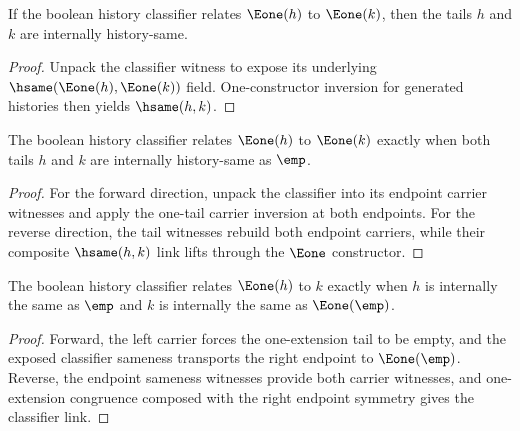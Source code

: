 \begin{theorem}
\label{thm:bool-history-classifier-e1-tail-hsame}
If the boolean history classifier relates $\Eone(h)$ to $\Eone(k)$, then the
tails $h$ and $k$ are internally history-same.
\end{theorem}
\begin{proof}
Unpack the classifier witness to expose its underlying
$\hsame(\Eone(h),\Eone(k))$ field. One-constructor inversion for generated
histories then yields $\hsame(h,k)$.
\end{proof}

\begin{theorem}
\label{thm:bool-history-classifier-e1-iff-tails-empty}
The boolean history classifier relates \(\Eone(h)\) to \(\Eone(k)\) exactly
when both tails \(h\) and \(k\) are internally history-same as \(\emp\).
\end{theorem}
\begin{proof}
For the forward direction, unpack the classifier into its endpoint carrier
witnesses and apply the one-tail carrier inversion at both endpoints. For the
reverse direction, the tail witnesses rebuild both endpoint carriers, while
their composite \(\hsame(h,k)\) link lifts through the \(\Eone\) constructor.
\end{proof}

\begin{theorem}
\label{thm:bool-history-classifier-eone-left-endpoints}
The boolean history classifier relates \(\Eone(h)\) to \(k\) exactly when
\(h\) is internally the same as \(\emp\) and \(k\) is internally the same as
\(\Eone(\emp)\).
\end{theorem}
\begin{proof}
Forward, the left carrier forces the one-extension tail to be empty, and the
exposed classifier sameness transports the right endpoint to
\(\Eone(\emp)\). Reverse, the endpoint sameness witnesses provide both carrier
witnesses, and one-extension congruence composed with the right endpoint
symmetry gives the classifier link.
\end{proof}

